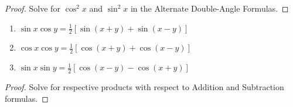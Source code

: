 \documentclass[a4paper,8pt]{article}
\begin{document}
\begin{outline}
    \begin{proof}
      Solve for \(\cos^2 x\) and \(\sin^2 x\) in the Alternate Double-Angle Formulas.
    \end{proof}

    \begin{enumerate}
      \item \(\sin{x}\cos{y} = \frac{1}{2}\left[\sin{(x+y)} + \sin{(x-y)}\right]\)
      \item \(\cos{x}\cos{y} = \frac{1}{2}\left[\cos{(x+y)} + \cos{(x-y)}\right]\)
      \item \(\sin{x}\sin{y} = \frac{1}{2}\left[\cos{(x-y)} - \cos{(x+y)}\right]\)
    \end{enumerate}

    \begin{proof}
      Solve for respective products with respect to Addition and Subtraction formulas.
    \end{proof}

\end{outline}
\end{document}
